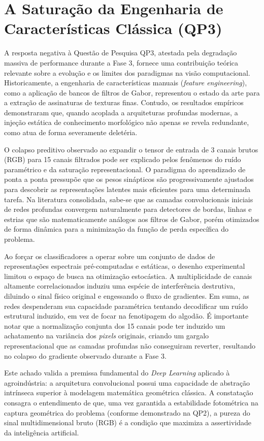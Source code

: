 \section{A Saturação da Engenharia de Características Clássica (QP3)}
\label{sec:saturacao_features}

A resposta negativa à Questão de Pesquisa QP3, atestada pela degradação massiva de performance durante a Fase 3, fornece uma contribuição teórica relevante sobre a evolução e os limites dos paradigmas na visão computacional. Historicamente, a engenharia de características manuais (\textit{feature engineering}), como a aplicação de bancos de filtros de Gabor, representou o estado da arte para a extração de assinaturas de texturas finas. Contudo, os resultados empíricos demonstraram que, quando acoplada a arquiteturas profundas modernas, a injeção estática de conhecimento morfológico não apenas se revela redundante, como atua de forma severamente deletéria.

O colapso preditivo observado ao expandir o tensor de entrada de 3 canais brutos (RGB) para 15 canais filtrados pode ser explicado pelos fenômenos do ruído paramétrico e da saturação representacional. O paradigma do aprendizado de ponta a ponta pressupõe que os pesos sinápticos são progressivamente ajustados para descobrir as representações latentes mais eficientes para uma determinada tarefa. Na literatura consolidada, sabe-se que as camadas convolucionais iniciais de redes profundas convergem naturalmente para detectores de bordas, linhas e estrias que são matematicamente análogos aos filtros de Gabor, porém otimizados de forma dinâmica para a minimização da função de perda específica do problema.

Ao forçar os classificadores a operar sobre um conjunto de dados de representações espectrais pré-computadas e estáticas, o desenho experimental limitou o espaço de busca na otimização estocástica. A multiplicidade de canais altamente correlacionados induziu uma espécie de interferência destrutiva, diluindo o sinal físico original e engessando o fluxo de gradientes. Em suma, as redes despenderam sua capacidade paramétrica tentando decodificar um ruído estrutural induzido, em vez de focar na fenotipagem do algodão. É importante notar que a normalização conjunta dos 15 canais pode ter induzido um achatamento na variância dos \textit{pixels} originais, criando um gargalo representacional que as camadas profundas não conseguiram reverter, resultando no colapso do gradiente observado durante a Fase 3.

Este achado valida a premissa fundamental do \textit{Deep Learning} aplicado à agroindústria: a arquitetura convolucional possui uma capacidade de abstração intrínseca superior à modelagem matemática geométrica clássica. A constatação consagra o entendimento de que, uma vez garantida a estabilidade fotométrica na captura geométrica do problema (conforme demonstrado na QP2), a pureza do sinal multidimensional bruto (RGB) é a condição que maximiza a assertividade da inteligência artificial.